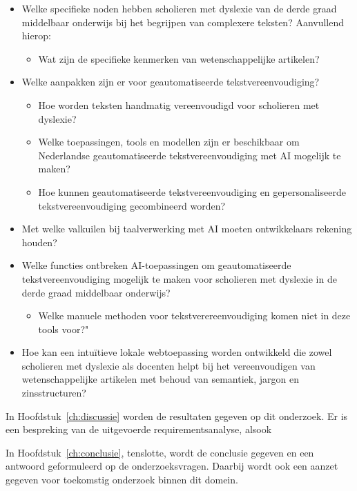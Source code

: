 \begin{itemize}
	\item Welke specifieke noden hebben scholieren met dyslexie van de derde graad middelbaar onderwijs bij het begrijpen van complexere teksten? Aanvullend hierop: 
	\begin{itemize}
		\item Wat zijn de specifieke kenmerken van wetenschappelijke artikelen?
	\end{itemize} 
	
	\item Welke aanpakken zijn er voor geautomatiseerde tekstvereenvoudiging?
	\begin{itemize}
		\item Hoe worden teksten handmatig vereenvoudigd voor scholieren met dyslexie?
		\item Welke toepassingen, tools en modellen zijn er beschikbaar om Nederlandse geautomatiseerde tekstvereenvoudiging met AI mogelijk te maken?
		\item Hoe kunnen geautomatiseerde tekstvereenvoudiging en gepersonaliseerde tekstvereenvoudiging gecombineerd worden?
	\end{itemize}
	
	\item Met welke valkuilen bij taalverwerking met AI moeten ontwikkelaars rekening
	houden?
	
	\item Welke functies ontbreken AI-toepassingen om geautomatiseerde tekstvereenvoudiging mogelijk te maken voor scholieren met dyslexie in de derde graad middelbaar onderwijs? 
	\begin{itemize}
		\item Welke manuele methoden voor tekstverereenvoudiging komen niet in deze tools voor?"
	\end{itemize}
	
	
	\item Hoe kan een intuïtieve lokale webtoepassing worden ontwikkeld die zowel scholieren met dyslexie als docenten helpt bij het vereenvoudigen van wetenschappelijke artikelen met behoud van semantiek, jargon en zinsstructuren?
\end{itemize}

In Hoofdstuk~\ref{ch:discussie} worden de resultaten gegeven op dit onderzoek. Er is een bespreking van de uitgevoerde requirementsanalyse, alsook 

In Hoofdstuk~\ref{ch:conclusie}, tenslotte, wordt de conclusie gegeven en een antwoord geformuleerd op de onderzoeksvragen. Daarbij wordt ook een aanzet gegeven voor toekomstig onderzoek binnen dit domein.